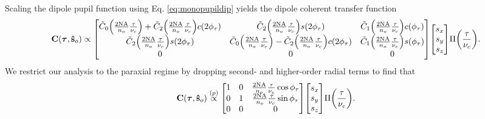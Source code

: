 \documentclass[]{osa-article}
\let\originalleft\left
\let\originalright\right
\renewcommand{\left}{\mathopen{}\mathclose\bgroup\originalleft}
\renewcommand{\right}{\aftergroup\egroup\originalright}
\providecommand{\mb}[1]{\mathbf{#1}}
\providecommand{\so}{\mathbf{\hat{s}}_o}
\providecommand{\bs}[1]{\boldsymbol{#1}}
\providecommand{\taup}{\bs{\tau}}
\begin{document}
 Scaling the dipole pupil function using Eq. \eqref{eq:monopupildip} yields the
 dipole coherent transfer function
 \begin{align}
   \mb{C}(\taup, \so) \propto
   \begin{bmatrix}
     \tilde{C}_0\left(\frac{\text{2NA}}{n_o}\frac{\tau}{\nu_c}\right) + \tilde{C}_2\left(\frac{\text{2NA}}{n_o}\frac{\tau}{\nu_c}\right)c(2\phi_{\tau})&\tilde{C}_2\left(\frac{\text{2NA}}{n_o}\frac{\tau}{\nu_c}\right)s(2\phi_{\tau})&\tilde{C}_1\left(\frac{\text{2NA}}{n_o}\frac{\tau}{\nu_c}\right)c(\phi_{\tau})\\
     \tilde{C}_2\left(\frac{\text{2NA}}{n_o}\frac{\tau}{\nu_c}\right)s(2\phi_{\tau})&\tilde{C}_0\left(\frac{\text{2NA}}{n_o}\frac{\tau}{\nu_c}\right) - \tilde{C}_2\left(\frac{\text{2NA}}{n_o}\frac{\tau}{\nu_c}\right)c(2\phi_{\tau})&\tilde{C}_1\left(\frac{\text{2NA}}{n_o}\frac{\tau}{\nu_c}\right)s(\phi_{\tau})\\     
     0&0&0\\     
   \end{bmatrix}
   \begin{bmatrix}
     s_x\\
     s_y\\
     s_z
   \end{bmatrix}
   \Pi\left(\frac{\tau}{\nu_c}\right). 
 \end{align}
 We restrict our analysis to the paraxial regime by dropping second- and
 higher-order radial terms to find that
 \begin{align}
   \mb{C}(\taup, \so) \stackrel{(p)}{\propto}
   \begin{bmatrix}
     1&0&\frac{\text{2NA}}{n_o}\frac{\tau}{\nu_c}\cos\phi_{\tau}\\
     0&1&\frac{\text{2NA}}{n_o}\frac{\tau}{\nu_c}\sin\phi_{\tau}\\
     0&0&0\\     
   \end{bmatrix}
   \begin{bmatrix}
     s_x\\
     s_y\\
     s_z
   \end{bmatrix}
   \Pi\left(\frac{\tau}{\nu_c}\right). \label{eq:coherentdip}
 \end{align}
\end{document}
